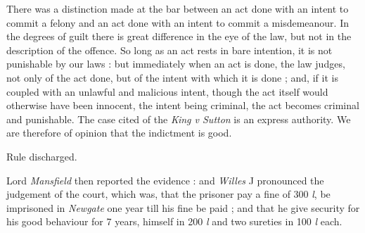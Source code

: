 \documentclass[a4paper]{article}
\begin{document}
 There was a distinction made at the bar between an act done with an intent to commit a felony and an act done with an intent to commit a misdemeanour. In the degrees of guilt there is great difference in the eye of the law, but not in the description of the offence. So long as an act rests in bare intention, it is not punishable by our laws : but immediately when an act is done, the law judges, not only of the act done, but of the intent with which it is done ; and, if it is coupled with an unlawful and malicious intent, though the act itself would otherwise have been innocent, the intent being criminal, the act becomes criminal and punishable. The case cited of the \emph{King v Sutton} is an express authority. We are therefore of opinion that the indictment is good.

\hspace{0.7\textwidth} Rule discharged.

Lord \emph{Mansfield} then reported the evidence : and \emph{Willes} J pronounced the judgement of the court, which was, that the prisoner pay a fine of 300 \emph{l}, be imprisoned in \emph{Newgate} one year till his fine be paid ; and that he give security for his good behaviour for 7 years, himself in 200 \emph{l} and two sureties in 100 \emph{l} each.
\end{document}
